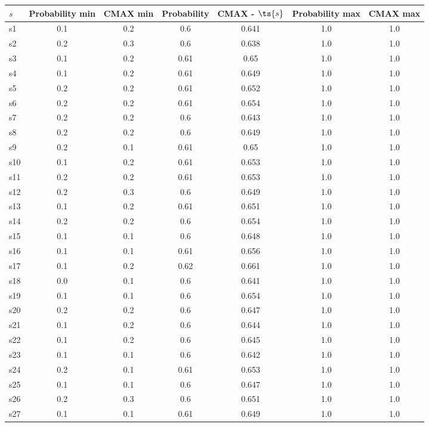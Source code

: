 \documentclass{article}
\begin{document}
\noindent\begin{tabular}{|l|c|c|c|c|c|c|}
\hline
$s$& Probability min & CMAX min & Probability & CMAX - $\ts{s}$ & Probability max & CMAX max\\
\hline
s1 &0.1 & 0.2 & 0.6 & 0.641 & 1.0 & 1.0\\
\hline
s2 &0.2 & 0.3 & 0.6 & 0.638 & 1.0 & 1.0\\
\hline
s3 &0.1 & 0.2 & 0.61 & 0.65 & 1.0 & 1.0\\
\hline
s4 &0.1 & 0.2 & 0.61 & 0.649 & 1.0 & 1.0\\
\hline
s5 &0.2 & 0.2 & 0.61 & 0.652 & 1.0 & 1.0\\
\hline
s6 &0.2 & 0.2 & 0.61 & 0.654 & 1.0 & 1.0\\
\hline
s7 &0.2 & 0.2 & 0.6 & 0.643 & 1.0 & 1.0\\
\hline
s8 &0.2 & 0.2 & 0.6 & 0.649 & 1.0 & 1.0\\
\hline
s9 &0.2 & 0.1 & 0.61 & 0.65 & 1.0 & 1.0\\
\hline
s10 &0.1 & 0.2 & 0.61 & 0.653 & 1.0 & 1.0\\
\hline
s11 &0.2 & 0.2 & 0.61 & 0.653 & 1.0 & 1.0\\
\hline
s12 &0.2 & 0.3 & 0.6 & 0.649 & 1.0 & 1.0\\
\hline
s13 &0.1 & 0.2 & 0.61 & 0.651 & 1.0 & 1.0\\
\hline
s14 &0.2 & 0.2 & 0.6 & 0.654 & 1.0 & 1.0\\
\hline
s15 &0.1 & 0.1 & 0.6 & 0.648 & 1.0 & 1.0\\
\hline
s16 &0.1 & 0.1 & 0.61 & 0.656 & 1.0 & 1.0\\
\hline
s17 &0.1 & 0.2 & 0.62 & 0.661 & 1.0 & 1.0\\
\hline
s18 &0.0 & 0.1 & 0.6 & 0.641 & 1.0 & 1.0\\
\hline
s19 &0.1 & 0.1 & 0.6 & 0.654 & 1.0 & 1.0\\
\hline
s20 &0.2 & 0.2 & 0.6 & 0.647 & 1.0 & 1.0\\
\hline
s21 &0.1 & 0.2 & 0.6 & 0.644 & 1.0 & 1.0\\
\hline
s22 &0.1 & 0.2 & 0.6 & 0.645 & 1.0 & 1.0\\
\hline
s23 &0.1 & 0.1 & 0.6 & 0.642 & 1.0 & 1.0\\
\hline
s24 &0.2 & 0.1 & 0.61 & 0.653 & 1.0 & 1.0\\
\hline
s25 &0.1 & 0.1 & 0.6 & 0.647 & 1.0 & 1.0\\
\hline
s26 &0.2 & 0.3 & 0.6 & 0.651 & 1.0 & 1.0\\
\hline
s27 &0.1 & 0.1 & 0.61 & 0.649 & 1.0 & 1.0\\

\end{tabular}
\end{document}
